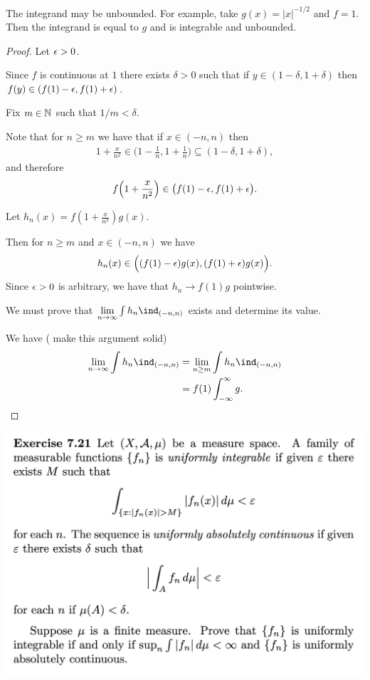 \begin{remark*}
  The integrand may be unbounded. For example, take $g(x) = |x|^{-1/2}$ and $f = 1$. Then the integrand is
  equal to $g$ and is integrable and unbounded.
\end{remark*}

\begin{proof}
    Let $\epsilon > 0$.

    Since $f$ is continuous at $1$ there exists $\delta > 0$ such that if $y \in (1 - \delta, 1 + \delta)$
    then $f(y) \in (f(1) - \epsilon, f(1) + \epsilon)$.

    Fix $m \in \mathbb{N}$ such that $1/m < \delta$.

    Note that for $n \geq m$ we have that if $x \in (-n, n)$
    then
    \begin{align*}
      1 + \frac{x}{n^2} \in \Big(1 - \frac{1}{n}, 1 + \frac{1}{n}\Big) \subseteq (1 - \delta, 1 + \delta),
    \end{align*}
    and therefore
    \begin{align*}
      f\Big(1 + \frac{x}{n^2}\Big) \in \big(f(1) - \epsilon, f(1) + \epsilon\big).
    \end{align*}

    Let $h_n(x) = f(1 +\frac{x}{n^{2}})g(x)$.

    Then for $n \geq m$ and $x \in (-n, n)$ we have
    \begin{align*}
      h_n(x) \in \Big((f(1) - \epsilon)g(x), (f(1) + \epsilon)g(x)\Big).
    \end{align*}
    Since $\epsilon > 0$ is arbitrary, we have that $h_n \to f(1)g$ pointwise.

    We must prove that $\limn \int h_n \ind_{(-n, n)}$ exists and determine its value.

    We have ( make this argument solid)
    \begin{align*}
      \limn \int h_n \ind_{(-n, n)}
      &= \lim_{n \geq m} \int h_n \ind_{(-n, n)} \\
      &= f(1)\int_{-\infty}^\infty g.
    \end{align*}
\end{proof}

\newpage
\begin{mdframed}
\includegraphics[width=400pt]{img/analysis--berkeley-202a-hw08-337f.png}
\end{mdframed}

